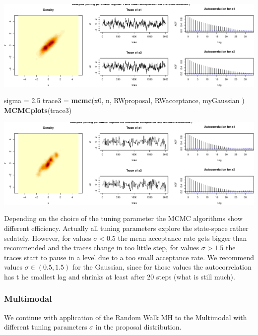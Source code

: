 \documentclass[
]{article}
\newenvironment{Shaded}{\begin{snugshade}}{\end{snugshade}}
\newcommand{\FloatTok}[1]{\textcolor[rgb]{0.00,0.00,0.81}{#1}}
\newcommand{\KeywordTok}[1]{\textcolor[rgb]{0.13,0.29,0.53}{\textbf{#1}}}
\newcommand{\NormalTok}[1]{#1}
\newcommand{\StringTok}[1]{\textcolor[rgb]{0.31,0.60,0.02}{#1}}
\begin{document}
\includegraphics{Project1_files/figure-latex/RandomWalk1-3.pdf}

\begin{Shaded}
\begin{Highlighting}[]
\NormalTok{sigma =}\StringTok{ }\FloatTok{2.5}
\NormalTok{trace3 =}\StringTok{ }\KeywordTok{mcmc}\NormalTok{(x0, n, RWproposal, RWacceptance, myGaussian )}
\KeywordTok{MCMCplots}\NormalTok{(trace3)}
\end{Highlighting}
\end{Shaded}

\includegraphics{Project1_files/figure-latex/RandomWalk1-4.pdf}

Depending on the choice of the tuning parameter the MCMC algorithms show
different efficiency. Actually all tuning parameters explore the
state-space rather sedately. However, for values \(\sigma<0.5\) the mean
acceptance rate gets bigger than recommended and the traces change in
too little step, for values \(\sigma>1.5\) the traces start to pause in
a level due to a too small acceptance rate. We recommend values
\(\sigma\in(0.5,1.5)\) for the Gaussian, since for those values the
autocorrelation has t he smallest lag and shrinks at least after 20
steps (what is still much).

\hypertarget{multimodal}{%
\subsubsection{Multimodal}\label{multimodal}}

We continue with application of the Random Walk MH to the Multimodal
with different tuning parameters \(\sigma\) in the proposal
distribution.
\end{document}
